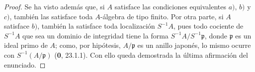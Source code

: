 \begin{proof}
Se ha visto además que, si $A$ satisface las condiciones equivalentes
$a)$, $b)$ y $c)$, también las satisface toda $A$-álgebra de tipo finito.
Por otra parte, si $A$ satisface $b)$, también la satisface toda
localización $S^{-1}A$, pues todo cociente de $S^{-1}A$ que sea un dominio
de integridad tiene la forma $S^{-1}A/S^{-1}\mathfrak p$, donde
$\mathfrak p$ es un ideal primo de $A$; como, por hipótesis,
$A/\mathfrak p$ es un anillo japonés, lo mismo ocurre con
$S^{-1}(A/\mathfrak p)$ (\textbf 0, 23.1.1). Con ello queda demostrada la última
afirmación del enunciado.
\end{proof}
